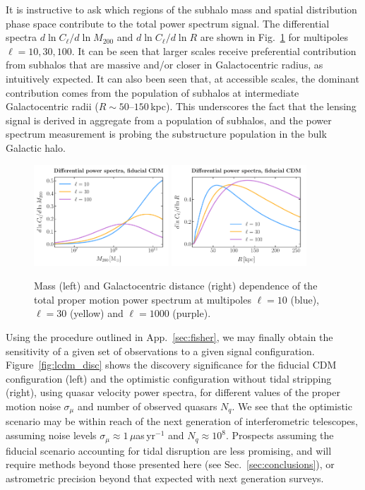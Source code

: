 \documentclass[twocolumn]{aastex63}
\begin{document}
It is instructive to ask which regions of the subhalo mass and spatial distribution phase space contribute to the total power spectrum signal. The differential spectra $d\ln C_\ell/d\ln M_{200}$ and $d\ln C_\ell/d\ln R$ are shown in Fig.~\ref{fig:pspec_differential} for multipoles $\ell=10, 30, 100$. It can be seen that larger scales receive preferential contribution from subhalos that are massive and/or closer in Galactocentric radius, as intuitively expected. It can also been seen that, at accessible scales, the dominant contribution comes from the population of subhalos at intermediate Galactocentric radii ($R\sim50$--$150$\,kpc). This underscores the fact that the lensing signal is derived in aggregate from a population of subhalos, and the power spectrum measurement is probing the substructure population in the bulk Galactic halo.


\begin{figure}[!htbp]
  \centering
  \includegraphics[width=0.45\textwidth]{plots/dlnCldlnM200}
  \includegraphics[width=0.45\textwidth]{plots/dlnCldlnR}
  \caption{Mass (left) and Galactocentric distance (right) dependence of the total proper motion power spectrum at multipoles $\ell=10$ (blue), $\ell=30$ (yellow) and $\ell=1000$ (purple).} \label{fig:pspec_differential}
\end{figure}

Using the procedure outlined in App.~\ref{sec:fisher}, we may finally obtain the sensitivity of a given set of observations to a given signal configuration. Figure~\ref{fig:lcdm_disc} shows the discovery significance for the fiducial CDM configuration (left) and the optimistic configuration without tidal stripping (right), using quasar velocity power spectra, for different values of the proper motion noise $\sigma_\mu$ and number of observed quasars $N_q$. We see that the optimistic scenario may be within reach of the next generation of interferometric telescopes, assuming noise levels $\sigma_\mu\approx 1\,\mu$as\,yr$^{-1}$ and $N_q\approx10^8$. Prospects assuming the fiducial scenario accounting for tidal disruption are less promising, and will require methods beyond those presented here (see Sec.~\ref{sec:conclusions}), or astrometric precision beyond that expected with next generation surveys.
\end{document}
